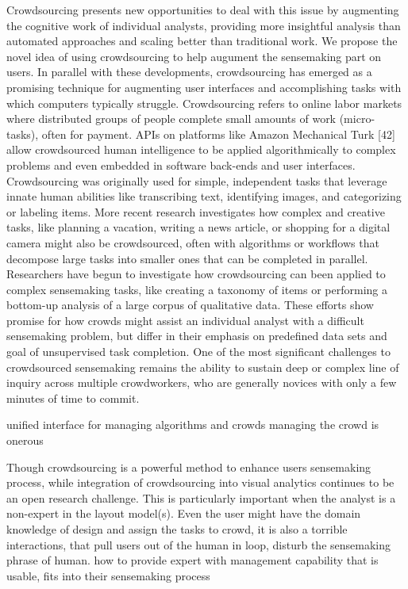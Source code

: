 \documentclass[journal]{vgtc}                %
\begin{document}
Crowdsourcing presents new opportunities to deal with this issue by augmenting the cognitive work of individual analysts, providing more insightful analysis than automated approaches and scaling better than traditional work. We propose the novel idea of using crowdsourcing to help augument the sensemaking part on users. In parallel with these developments, crowdsourcing has emerged as a promising technique for augmenting user interfaces and accomplishing tasks with which computers typically struggle. Crowdsourcing refers to online labor markets where distributed groups of people complete small amounts of work (micro-tasks), often for payment. APIs on platforms like Amazon Mechanical Turk [42] allow crowdsourced human intelligence to be applied algorithmically to complex problems and even embedded in software back-ends and user interfaces. Crowdsourcing was originally used for simple, independent tasks that leverage innate human abilities like transcribing text, identifying images, and categorizing or labeling items. More recent
research investigates how complex and creative tasks, like planning a vacation, writing a news article, or shopping for a digital camera might also be crowdsourced, often with algorithms or workflows that decompose large tasks into smaller ones that can be completed in parallel.
Researchers have begun to investigate how crowdsourcing can been applied to complex sensemaking tasks, like creating a taxonomy of items or performing a bottom-up analysis of a large corpus of qualitative data. These efforts show promise for how crowds might assist an individual analyst with a difficult sensemaking problem, but differ in their emphasis on predefined data sets and goal of unsupervised task completion. One of the most significant challenges to crowdsourced sensemaking remains the ability to sustain deep or complex line of inquiry across multiple crowdworkers, who are generally novices with only a few minutes of time to commit.


unified interface for managing algorithms and crowds
managing the crowd is onerous

Though crowdsourcing is a powerful method to enhance users sensemaking process, while integration of crowdsourcing into visual analytics continues to be an open research challenge.
This is particularly important when the analyst is a non-expert in the layout model(s).
Even the user might have the domain knowledge of design and assign the tasks to crowd, it is also a torrible interactions, that pull users out of the human in loop, disturb the sensemaking phrase of human.
how to provide expert with management capability that is usable, fits into their sensemaking process
\end{document}
